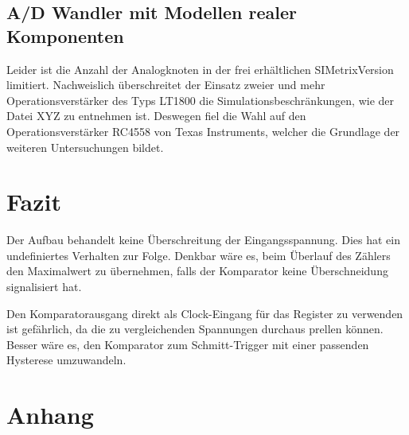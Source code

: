 \documentclass[
	ngerman,
	parskip=half,
	headsepline,
	fontsize=12pt,
	DIV=13,
	listof=leveldown,
	]{scrreprt}
\begin{document}
		\section{A/D Wandler mit Modellen realer Komponenten}
		Leider ist die Anzahl der Analogknoten in der frei erhältlichen SIMetrix\texttrademark Version limitiert. Nachweislich überschreitet der Einsatz zweier und mehr Operationsverstärker des Typs LT1800  die Simulationsbeschränkungen, wie der Datei XYZ zu entnehmen ist. Deswegen fiel die Wahl auf den Operationsverstärker RC4558 von Texas Instruments, welcher die Grundlage der weiteren Untersuchungen bildet. 
		
		\chapter{Fazit}	
		
		Der Aufbau behandelt keine Überschreitung der Eingangsspannung.  Dies hat ein undefiniertes Verhalten zur Folge. Denkbar wäre es, beim Überlauf des Zählers den Maximalwert zu übernehmen, falls der Komparator keine Überschneidung signalisiert hat. 
		
		Den Komparatorausgang direkt als Clock-Eingang für das Register zu verwenden ist gefährlich, da die zu vergleichenden Spannungen durchaus prellen können. Besser wäre es, den Komparator zum Schmitt-Trigger mit einer passenden Hysterese umzuwandeln.
	
	\chapter{Anhang}
		
\end{document}
